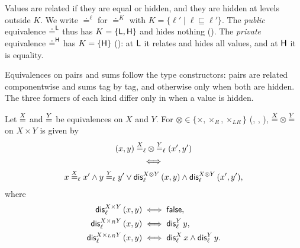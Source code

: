 Values are related if they are equal or hidden, and they are hidden at levels outside $K$. We write $\doteq^\ell$ for $\doteq^K$ with
$K = \{\ell' \mid \ell \sqsubseteq \ell'\}$. The \emph{public} equivalence ${\doteq^{\mathsf{L}}}$ thus has $K = \{\mathsf{L}, \mathsf{H}\}$ and hides
nothing (). The \emph{private} equivalence ${\doteq^{\mathsf{H}}}$ has
$K = \{\mathsf{H}\}$ (): at $\mathsf{L}$ it relates and hides all values,
and at $\mathsf{H}$ it is equality.

Equivalences on pairs and sums follow the type constructors: pairs are related
componentwise and sums tag by tag, and otherwise only when both are hidden.
The three formers of each kind differ only in when a value is hidden.

\begin{definition}[Products]\label{def:formers}
Let $\overset{X}{=}$ and $\overset{Y}{=}$ be equivalences on $X$ and $Y$. For
${\otimes} \in \{{\times}, {\times_R}, {\times_{LR}}\}$ (, ,
), ${\overset{X}{=}} \otimes {\overset{Y}{=}}$ on $X \times Y$ is given by
\begin{gather*}
(x,y) \mathrel{{\overset{X}{=}}_\ell \otimes {\overset{Y}{=}}_\ell} (x',y') \\
\iff \\
x \overset{X}{=}_\ell x' \wedge y \overset{Y}{=}_\ell y' \vee
  \mathsf{dis}^{X \otimes Y}_\ell\,(x,y) \wedge \mathsf{dis}^{X \otimes Y}_\ell\,(x',y'),
\end{gather*}
where
\begin{align*}
\mathsf{dis}^{X \times Y}_\ell\,(x,y) &\iff \mathsf{false}, \\
\mathsf{dis}^{X \times_R Y}_\ell\,(x,y) &\iff \mathsf{dis}^Y_\ell\,y, \\
\mathsf{dis}^{X \times_{LR} Y}_\ell\,(x,y) &\iff \mathsf{dis}^X_\ell\,x \wedge \mathsf{dis}^Y_\ell\,y.
\end{align*}
\end{definition}

